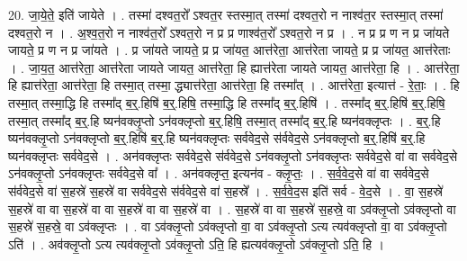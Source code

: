 \documentclass[17pt]{extarticle}
\begin{document}
20. जा॒ये॒ते॒ इति॑ जायेते । . तस्मा॑ दश्वत॒रो᳚ ऽश्वत॒र स्तस्मा॒त् तस्मा॑ दश्वत॒रो न नाश्व॑त॒र स्तस्मा॒त् तस्मा॑ दश्वत॒रो न । . अ॒श्व॒त॒रो न नाश्व॑त॒रो᳚ ऽश्वत॒रो न प्र प्र णाश्व॑त॒रो᳚ ऽश्वत॒रो न प्र । . न प्र प्र ण न प्र जा॑यते जायते॒ प्र ण न प्र जा॑यते । . प्र जा॑यते जायते॒ प्र प्र जा॑यत॒ आत्त॑रेता॒ आत्त॑रेता जायते॒ प्र प्र जा॑यत॒ आत्त॑रेताः । . जा॒य॒त॒ आत्त॑रेता॒ आत्त॑रेता जायते जायत॒ आत्त॑रेता॒ हि ह्यात्त॑रेता जायते जायत॒ आत्त॑रेता॒ हि । . आत्त॑रेता॒ हि ह्यात्त॑रेता॒ आत्त॑रेता॒ हि तस्मा॒त् तस्मा॒ द्ध्यात्त॑रेता॒ आत्त॑रेता॒ हि तस्मा᳚त् । . आत्त॑रेता॒ इत्यात्त॑ - रे॒ताः॒ । . हि तस्मा॒त् तस्मा॒द्धि हि तस्मा᳚द् ब॒र्॒.हिषि॑ ब॒र्॒.हिषि॒ तस्मा॒द्धि हि तस्मा᳚द् ब॒र्॒.हिषि॑ । . तस्मा᳚द् ब॒र्॒.हिषि॑ ब॒र्॒.हिषि॒ तस्मा॒त् तस्मा᳚द् ब॒र्॒.हि ष्यन॑वक्लृ॒प्तो ऽन॑वक्लृप्तो ब॒र्॒.हिषि॒ तस्मा॒त् तस्मा᳚द् ब॒र्॒.हि ष्यन॑वक्लृप्तः । . ब॒र्॒.हि ष्यन॑वक्लृ॒प्तो ऽन॑वक्लृप्तो ब॒र्॒.हिषि॑ ब॒र्॒.हि ष्यन॑वक्लृप्तः सर्ववेद॒से स॑र्ववेद॒से ऽन॑वक्लृप्तो ब॒र्॒.हिषि॑ ब॒र्॒.हि ष्यन॑वक्लृप्तः सर्ववेद॒से । . अन॑वक्लृप्तः सर्ववेद॒से स॑र्ववेद॒से ऽन॑वक्लृ॒प्तो ऽन॑वक्लृप्तः सर्ववेद॒से वा॑ वा सर्ववेद॒से ऽन॑वक्लृ॒प्तो ऽन॑वक्लृप्तः सर्ववेद॒से वा᳚ । . अन॑वक्लृप्त॒ इत्यन॑व - क्लृ॒प्तः॒ । . स॒र्व॒वे॒द॒से वा॑ वा सर्ववेद॒से स॑र्ववेद॒से वा॑ स॒हस्रे॑ स॒हस्रे॑ वा सर्ववेद॒से स॑र्ववेद॒से वा॑ स॒हस्रे᳚ । . स॒र्व॒वे॒द॒स इति॑ सर्व - वे॒द॒से । . वा॒ स॒हस्रे॑ स॒हस्रे॑ वा वा स॒हस्रे॑ वा वा स॒हस्रे॑ वा वा स॒हस्रे॑ वा । . स॒हस्रे॑ वा वा स॒हस्रे॑ स॒हस्रे॒ वा ऽव॑क्लृ॒प्तो ऽव॑क्लृप्तो वा स॒हस्रे॑ स॒हस्रे॒ वा ऽव॑क्लृप्तः । . वा ऽव॑क्लृ॒प्तो ऽव॑क्लृप्तो वा॒ वा ऽव॑क्लृ॒प्तो ऽत्य त्यव॑क्लृप्तो वा॒ वा ऽव॑क्लृ॒प्तो ऽति॑ । . अव॑क्लृ॒प्तो ऽत्य त्यव॑क्लृ॒प्तो ऽव॑क्लृ॒प्तो ऽति॒ हि ह्यत्यव॑क्लृ॒प्तो ऽव॑क्लृ॒प्तो ऽति॒ हि । \newline
\end{document}
